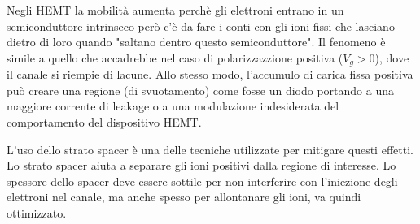 \begin{minipage}{0.49\textwidth}
       \begin{center}
    \end{center}
\end{minipage}

Negli HEMT la mobilità aumenta perchè gli elettroni entrano in un semiconduttore intrinseco però c'è da fare i conti con gli ioni fissi che lasciano dietro di loro quando "saltano dentro questo semiconduttore". 
Il fenomeno è simile a quello che accadrebbe nel caso di polarizzazzione positiva ($V_g>0$), dove il canale si riempie di lacune. Allo stesso modo, l'accumulo di carica fissa positiva può creare una regione (di svuotamento) come fosse un diodo portando a una maggiore corrente di leakage o a una modulazione indesiderata del comportamento del dispositivo HEMT.

L'uso dello strato spacer è una delle tecniche utilizzate per mitigare questi effetti. Lo strato spacer aiuta a separare gli ioni positivi dalla regione di interesse. Lo spessore dello spacer deve essere sottile per non interferire con l'iniezione degli elettroni nel canale, ma anche spesso per allontanare gli ioni, va quindi ottimizzato.\\

